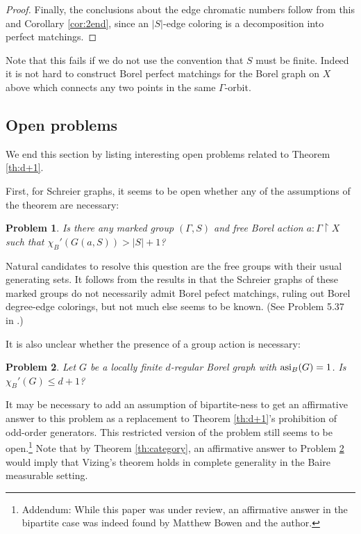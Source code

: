 \documentclass[12pt]{article}
\newcommand{\0}{\varnothing}
\newcommand{\asi}{\textnormal{asi}}
\newcommand{\res}{\upharpoonright}
\newtheorem{prob}{Problem}
\begin{document}
\begin{proof}
Finally, the conclusions about the edge chromatic numbers follow from this and Corollary \ref{cor:2end}, since an $|S|$-edge coloring is a decomposition into perfect matchings.

\end{proof}

Note that this fails if we do not use the convention that $S$ must be finite. Indeed it is not hard to construct Borel perfect matchings for the Borel graph on $X$ above which connects any two points in the same $\Gamma$-orbit. 

\subsection{Open problems}

We end this section by listing interesting open problems related to Theorem \ref{th:d+1}.

First, for Schreier graphs, it seems to be open whether any of the assumptions of the theorem are necessary:

\begin{prob}
Is there any marked group $(\Gamma,S)$ and free Borel action $a:\Gamma \res X$ such that $\chi_B'(G(a,S)) > |S| + 1$?
\end{prob}

Natural candidates to resolve this question are the free groups with their usual generating sets. It follows from the results in \cite{M15} that the Schreier graphs of these marked groups do not necessarily admit Borel pefect matchings, ruling out Borel degree-edge colorings, but not much else seems to be known. (See Problem 5.37 in \cite{KM}.)

It is also unclear whether the presence of a group action is necessary:

\begin{prob}\label{prob:nogroup}
Let $G$ be a locally finite $d$-regular Borel graph with $\asi_B(G) = 1$. Is $\chi_B'(G) \leq d+1$?
\end{prob}

It may be necessary to add an assumption of bipartite-ness to get an affirmative answer to this problem as a replacement to Theorem \ref{th:d+1}'s prohibition of odd-order generators. This restricted version of the problem still seems to be open.\footnote{Addendum: While this paper was under review, an affirmative answer in the bipartite case was indeed found by Matthew Bowen and the author.} Note that by Theorem \ref{th:category}, an affirmative answer to Problem \ref{prob:nogroup} would imply that Vizing's theorem holds in complete generality in the Baire measurable setting.
\end{document}

